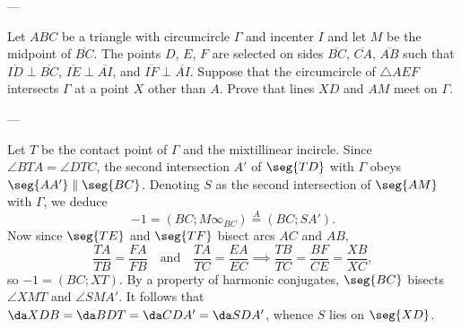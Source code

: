 
---

Let $ABC$ be a triangle with circumcircle $\Gamma$ and incenter $I$ and let $M$ be the midpoint of $\overline{BC}$. The points $D$, $E$, $F$ are selected on sides $\overline{BC}$, $\overline{CA}$, $\overline{AB}$ such that $\overline{ID}\perp\overline{BC}$, $\overline{IE}\perp\overline{AI}$, and $\overline{IF}\perp\overline{AI}$. Suppose that the circumcircle of $\triangle AEF$ intersects $\Gamma$ at a point $X$ other than $A$. Prove that lines $XD$ and $AM$ meet on $\Gamma$.

---

Let $T$ be the contact point of $\Gamma$ and the mixtillinear incircle. Since $\angle BTA=\angle DTC$, the second intersection $A'$ of $\seg{TD}$ with $\Gamma$ obeys $\seg{AA'}\parallel\seg{BC}$. Denoting $S$ as the second intersection of $\seg{AM}$ with $\Gamma$, we deduce \[-1=(BC;M\infty_{BC})\stackrel A=(BC;SA').\]
Now since $\seg{TE}$ and $\seg{TF}$ bisect arcs $AC$ and $AB$, \[\frac{TA}{TB}=\frac{FA}{FB}\quad\text{and}\quad\frac{TA}{TC}=\frac{EA}{EC}\implies\frac{TB}{TC}=\frac{BF}{CE}=\frac{XB}{XC},\]
so $-1=(BC;XT)$. By a property of harmonic conjugates, $\seg{BC}$ bisects $\angle XMT$ and $\angle SMA'$. It follows that $\da XDB=\da BDT=\da CDA'=\da SDA'$, whence $S$ lies on $\seg{XD}$.

